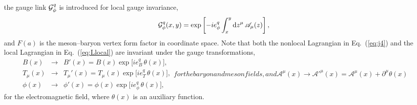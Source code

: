 \documentclass[preprintnumbers,prd,superscriptaddress,preprint]{revtex4-1}
\begin{document}
the gauge link ${\cal G}_\phi^q$ is introduced for local gauge invariance,
%
\begin{equation}
{\cal G}_\phi^q(x,y)
= \exp\left[ -i e^q_\phi \int_x^y \dd{z}^\mu \mathscr{A}_\mu(z)  \right],
\label{eq:link}
\end{equation}
%
and $F(a)$ is the meson--baryon vertex form factor in coordinate space.
%
Note that both the nonlocal Lagrangian in Eq.~(\ref{eq:j4}) and the local Lagrangian in Eq.~(\ref{eq:Llocal}) are invariant under the gauge transformations,
%
\begin{subequations}
\begin{eqnarray}
B(x) &\to& 
B'(x) = B(x) \exp\big[i e^q_B\, \theta(x)\big],
\\
T_\mu(x) &\to&
T_\mu'(x) = T_\mu(x) \exp\big[i e^q_T\, \theta(x)\big],
\\
\phi(x) &\to&
\phi'(x) = \phi(x) \exp\big[i e^q_\phi\, \theta(x)\big],
\end{eqnarray}
%
for the baryon and meson fields, and
%
\begin{equation}
\mathscr{A}^\mu(x) \to
\mathscr{A}'^\mu(x) = \mathscr{A}^\mu(x) + \partial^\mu \theta(x)
\end{equation}
\end{subequations}
%
for the electromagnetic field, where $\theta(x)$ is an auxiliary function.
\end{document}

